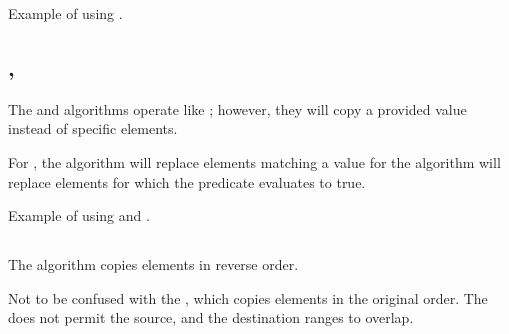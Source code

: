\begin{box-note}
\footnotesize Example of using .
\tcblower
{}
\end{box-note}

\subsection{\texorpdfstring{, }{\texttt{std::replace\_copy}, \texttt{std::replace\_copy\_if}}}

The  and  algorithms operate like ; however, they will copy a provided value instead of specific elements.

For , the algorithm will replace elements matching a value for  the algorithm will replace elements for which the predicate evaluates to true.


\begin{box-note}
\footnotesize Example of using  and .
\tcblower
{}
\end{box-note}

\subsection{\texorpdfstring{}{\texttt{std::reverse\_copy}}}

The  algorithm copies elements in reverse order.


Not to be confused with the , which copies elements in the original order. The  does not permit the source, and the destination ranges to overlap.


